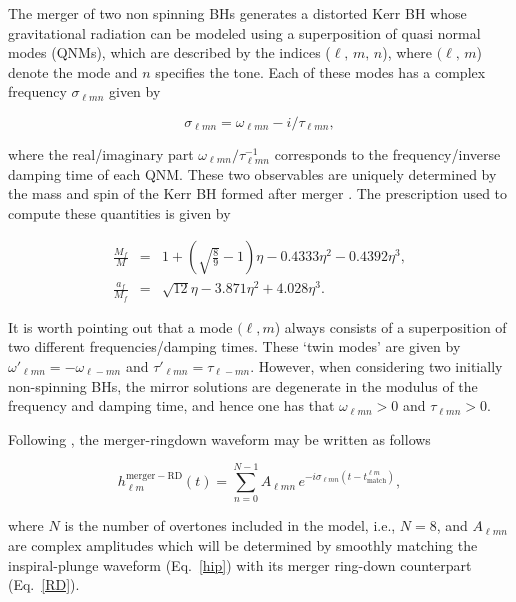 The merger of two non spinning BHs generates a distorted Kerr BH whose gravitational radiation can be modeled using a superposition of quasi normal modes (QNMs), which are described by the indices (\(\ell,\, m,\,n\)), where \((\ell,\,m\)) denote the mode and \(n\) specifies the tone.  Each of these modes has a complex frequency \(\sigma_{\ell m n}\) given by

\begin{equation}
\sigma_{\ell mn} = \omega_{\ell m n} -i/\tau_{\ell m n},
\label{qnms}
\end{equation}

\noindent where the real/imaginary part \( \omega_{\ell m n}/\tau_{\ell m n}^{-1}\) corresponds to the frequency/inverse damping time of each QNM. These two observables are uniquely determined by the mass and spin of the Kerr BH formed after merger \cite{rdeq}. The prescription used to compute these quantities is given by  \cite{BuonannoEOBv2Main}

\begin{subequations}
\label{finalMS}
\begin{eqnarray}
    \!\!\!\!\!\!\frac{M_f}{M} &=& 1+\left (\sqrt{\frac{8}{9}}-1\right )\eta-0.4333 \eta^2-0.4392 \eta^3, \\
    \!\!\!\!\!\!\!\!\frac{a_f}{M_f} &=& \sqrt{12}\eta-3.871 \eta^2+4.028 \eta^3.
\end{eqnarray}
\end{subequations}

It is worth pointing out that a mode \((\ell,m\)) always consists of a superposition of two different frequencies/damping times. These `twin modes' are given by \( \omega'_{\ell m n} = -  \omega_{\ell -m n}\) and \(\tau'_{\ell m n} = \tau_{\ell -m n}\).  However, when considering two initially non-spinning BHs, the mirror solutions are degenerate in the modulus of the frequency and damping time, and hence one has that \( \omega_{\ell m n}>0\) and \( \tau_{\ell m n} >0\). 

Following \cite{BuonannoEOBv2Main}, the merger-ringdown waveform may be written as follows 

\begin{equation}
  \label{RD}
  h_{\ell m}^\mathrm{merger-RD}(t) = \sum_{n=0}^{N-1} A_{\ell mn}\,e^{-i\sigma_{\ell mn} (t-t_\mathrm{match}^{\ell m})},
\end{equation}
 
 \noindent where \(N\) is the number of overtones included in the model, i.e., \(N=8\), and \(A_{\ell mn}\) are complex amplitudes which will be determined by smoothly matching the inspiral-plunge waveform (Eq.~\eqref{hip}) with its merger ring-down counterpart (Eq.~\eqref{RD}).  
 
